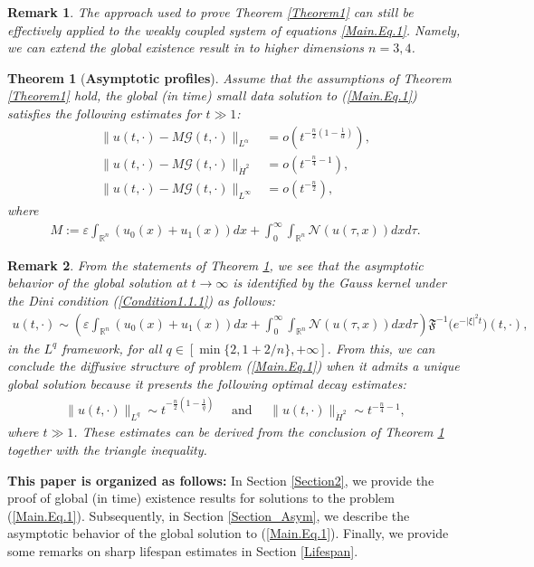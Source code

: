 \documentclass[11pt,reqno]{amsart}
\newtheorem{theorem}{Theorem}[section]
\newtheorem{remark}{Remark}[section]
\begin{document}
\begin{remark}
\selectfont
    The approach used to prove Theorem \ref{Theorem1} can still be effectively applied to the weakly coupled system of equations \eqref{Main.Eq.1}. Namely, we can extend the global existence result in \cite{AnhRei2021} to higher dimensions $n=3,4$.
\end{remark}



\begin{theorem}[\textbf{Asymptotic profiles}] \label{Theorem3}
    Assume that the assumptions of Theorem \ref{Theorem1} hold, the global (in time)
small data solution to (\ref{Main.Eq.1}) satisfies the following estimates for $t \gg 1$:
\begin{align*}
    \|u(t,\cdot) - M \mathcal{G}(t,\cdot)\|_{L^\alpha} &= o(t^{-\frac{n}{2}(1-\frac{1}{\alpha})}),\\
    \|u(t,\cdot)-M \mathcal{G}(t,\cdot)\|_{\dot{H}^2} &= o(t^{-\frac{n}{4}-1}),\\
    \|u(t,\cdot)-M \mathcal{G}(t,\cdot)\|_{L^\infty} &= o(t^{-\frac{n}{2}}),
\end{align*}
where
\begin{align}\label{Defi_1}
    M := \varepsilon\int_{\mathbb{R}^n} (u_0(x) +  u_1(x)) dx + \int_0^{\infty} \int_{\mathbb{R}^n} \mathcal{N}(u(\tau,x)) dx d\tau.
\end{align}
\end{theorem}
\begin{remark}
\selectfont
    From the statements of Theorem \ref{Theorem3}, we  see that the asymptotic behavior of the global solution at $t \to \infty$ is identified by the Gauss kernel under the Dini condition (\ref{Condition1.1.1}) as follows:
\begin{align*}
    u(t,\cdot) \sim \left(\varepsilon\int_{\mathbb{R}^n} (u_0(x) +  u_1(x)) dx + \int_0^{\infty} \int_{\mathbb{R}^n} \mathcal{N}(u(\tau,x)) dx d\tau\right) \mathfrak{F}^{-1}\big(e^{-|\xi|^2t}\big)(t,\cdot),  
\end{align*}
in the $L^q$ framework, for all $q \in \left[\min\{2, 1+2/n\}, +\infty\right]$.  From this, we can conclude the diffusive structure of problem (\ref{Main.Eq.1}) when it admits a unique global solution because it presents the following optimal decay estimates:
\begin{align*}
    \|u(t,\cdot)\|_{L^q} \sim t^{-\frac{n}{2}(1-\frac{1}{q})} \quad\text{ and } \quad
    \|u(t,\cdot)\|_{\dot{H}^2} \sim t^{-\frac{n}{4}-1},
\end{align*}
where $t \gg 1$. These estimates can be derived from the conclusion of Theorem \ref{Theorem3} together with the triangle inequality.
\end{remark}
\textbf{This paper is organized as follows:} In Section \ref{Section2}, we provide the proof of global (in time) existence results for solutions to the problem (\ref{Main.Eq.1}). Subsequently, in Section \ref{Section_Asym}, we describe the asymptotic behavior of the global solution to (\ref{Main.Eq.1}). Finally, we provide some remarks on sharp lifespan estimates in Section \ref{Lifespan}.
\end{document}
